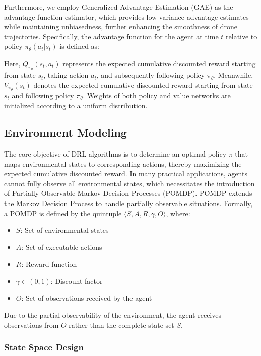 \documentclass{aas}
\begin{document}
Furthermore, we employ Generalized Advantage Estimation (GAE) as the advantage function estimator, which provides low-variance advantage estimates while maintaining unbiasedness, further enhancing the smoothness of drone trajectories. Specifically, the advantage function for the agent at time \( t \) relative to policy \( \pi_{\theta} (a_t | s_t) \) is defined as:


Here, \( Q_{\pi_{\theta}}(s_t, a_t) \) represents the expected cumulative discounted reward starting from state \( s_t \), taking action \( a_t \), and subsequently following policy \( \pi_{\theta} \). Meanwhile, \( V_{\pi_{\theta}}(s_t) \) denotes the expected cumulative discounted reward starting from state \( s_t \) and following policy \( \pi_{\theta} \). Weights of both policy and value networks are initialized according to a uniform distribution.
\subsection{Environment Modeling}


The core objective of DRL algorithms is to determine an optimal policy \(\pi\) that maps environmental states to corresponding actions, thereby maximizing the expected cumulative discounted reward. In many practical applications, agents cannot fully observe all environmental states, which necessitates the introduction of Partially Observable Markov Decision Processes (POMDP). POMDP extends the Markov Decision Process to handle partially observable situations. Formally, a POMDP is defined by the quintuple \(\langle S, A, R, \gamma, O \rangle\), where:
\begin{itemize}
    \item \(S\): Set of environmental states
    \item \(A\): Set of executable actions
    \item \(R\): Reward function
    \item \(\gamma \in (0, 1)\): Discount factor
    \item \(O\): Set of observations received by the agent
\end{itemize}
Due to the partial observability of the environment, the agent receives observations from \(O\) rather than the complete state set \(S\).

\subsubsection{State Space Design}
\end{document}
